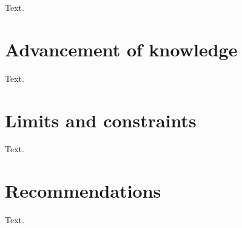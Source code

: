 \label{sec:Conclusion}
Text.

\section{Advancement of knowledge}
Text.

\section{Limits and constraints}
\label{sec:Limits and constraints}
Text.

\section{Recommendations}
Text.
